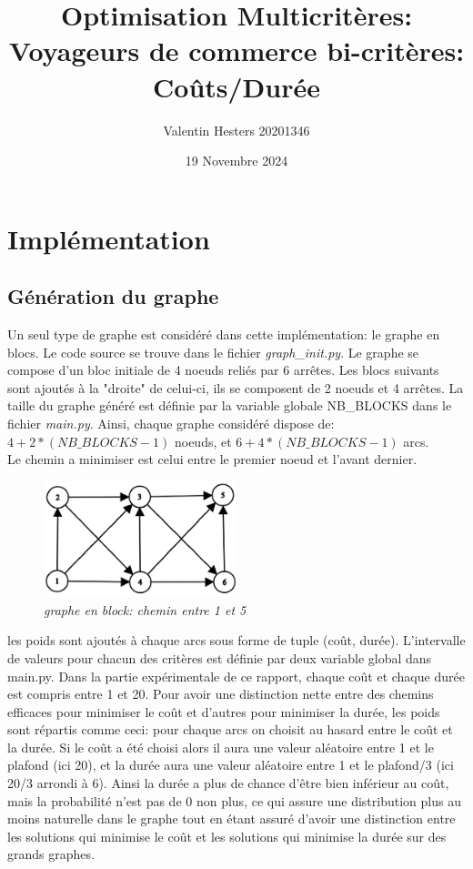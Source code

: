 \documentclass[]{article}
\title{Optimisation Multicritères:\\
        Voyageurs de commerce bi-critères: Coûts/Durée}
\author{Valentin Hesters 20201346}
\date{19 Novembre 2024}
\begin{document}
\maketitle
\renewcommand*{\contentsname}{Sommaire}
\tableofcontents

\section{Implémentation}
    \subsection{Génération du graphe}
        Un seul type de graphe est considéré dans cette implémentation:
        le graphe en blocs. Le code source se trouve dans le fichier
        \textit{graph\_init.py}. Le graphe se compose d'un bloc initiale de 4 noeuds
        reliés par 6 arrêtes. Les blocs suivants sont ajoutés à la 
        "droite" de celui-ci, ils se composent de 2 noeuds et 4 arrêtes.
        La taille du graphe généré est définie par la variable globale
        NB\_BLOCKS dans le fichier \textit{main.py}. Ainsi, chaque graphe
        considéré dispose de:\\
        $4 + 2 * (NB\_BLOCKS - 1)$ noeuds, et $6 + 4 * (NB\_BLOCKS - 1)$ arcs.\\
        Le chemin a minimiser est celui entre le premier noeud
        et l'avant dernier.
        \begin{figure}[H]
            \centering
            \includegraphics[width=0.5\textwidth]{output/pixelcut-export.png}
            \caption{\textit{graphe en block: chemin entre 1 et 5}}
        \end{figure}

        les poids sont ajoutés à chaque arcs sous forme de tuple (coût, durée). 
        L'intervalle de valeurs pour chacun des critères est définie par deux variable
        global dans main.py. Dans la partie expérimentale de ce rapport, chaque coût
        et chaque durée est compris entre 1 et 20. Pour avoir une distinction nette entre
        des chemins efficaces pour minimiser le coût et d'autres pour minimiser la durée,
        les poids sont répartis comme ceci: pour chaque arcs on choisit au hasard
        entre le coût et la durée. Si le coût a été choisi alors il aura une valeur
        aléatoire entre 1 et le plafond (ici 20), et la durée aura une valeur aléatoire
        entre 1 et le plafond/3 (ici 20/3 arrondi à 6). Ainsi la durée a plus de chance 
        d'être bien inférieur au coût, mais la probabilité n'est pas de 0 non plus, ce qui
        assure une distribution plus au moins naturelle dans le graphe tout en étant assuré
        d'avoir une distinction entre les solutions qui minimise le coût et les solutions qui
        minimise la durée sur des grands graphes.
\end{document}
